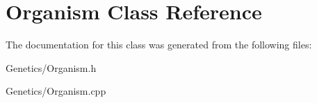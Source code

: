 \hypertarget{class_organism}{}\section{Organism Class Reference}
\label{class_organism}


The documentation for this class was generated from the following files\+:\begin{DoxyCompactItemize}
\item 
Genetics/Organism.\+h\item 
Genetics/Organism.\+cpp\end{DoxyCompactItemize}
